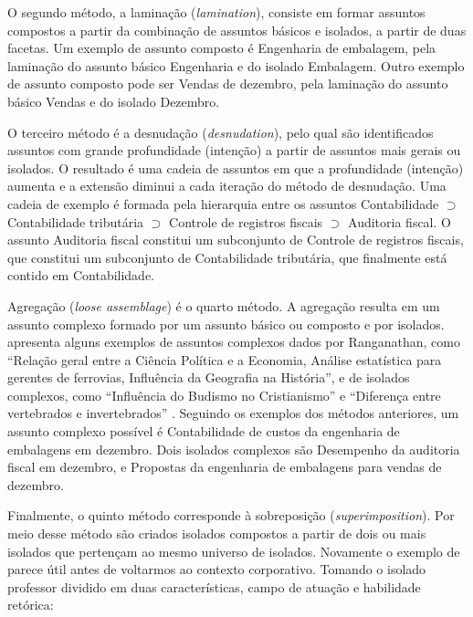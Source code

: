 
O segundo método, a laminação (\textit{lamination}), consiste em formar assuntos compostos a partir da combinação de assuntos básicos e isolados, a partir de duas facetas. Um exemplo de assunto composto é Engenharia de embalagem, pela laminação do assunto básico Engenharia e do isolado Embalagem. Outro exemplo de assunto composto pode ser Vendas de dezembro, pela laminação do assunto básico Vendas e do isolado Dezembro.

O terceiro método é a desnudação (\textit{desnudation}), pelo qual são identificados assuntos com grande profundidade (intenção) a partir de assuntos mais gerais ou isolados. O resultado é uma cadeia de assuntos em que a profundidade (intenção) aumenta e a extensão diminui a cada iteração do método de desnudação. Uma cadeia de exemplo é formada pela hierarquia entre os assuntos Contabilidade $\supset$ Contabilidade tributária $\supset$ Controle de registros fiscais $\supset$ Auditoria fiscal. O assunto Auditoria fiscal constitui um subconjunto de Controle de registros fiscais, que constitui um subconjunto de Contabilidade tributária, que finalmente está contido em Contabilidade.

Agregação (\textit{loose assemblage}) é o quarto método. A agregação resulta em um assunto complexo formado por um assunto básico ou composto e por isolados.  apresenta alguns exemplos de assuntos complexos dados por Ranganathan, como ``Relação geral entre a Ciência Política e a Economia, Análise estatística para gerentes de ferrovias, Influência da Geografia na História'', e de isolados complexos, como ``Influência do Budismo no Cristianismo'' e ``Diferença entre vertebrados e invertebrados'' \cite[p. 63]{lima04spiteri}. Seguindo os exemplos dos métodos anteriores, um assunto complexo possível é Contabilidade de custos da engenharia de embalagens em dezembro. Dois isolados complexos são Desempenho da auditoria fiscal em dezembro, e Propostas da engenharia de embalagens para vendas de dezembro.

Finalmente, o quinto método corresponde à sobreposição (\textit{superimposition}). Por meio desse método são criados isolados compostos a partir de dois ou mais isolados que pertençam ao mesmo universo de isolados. Novamente o exemplo de  parece útil antes de voltarmos ao contexto corporativo. Tomando o isolado professor dividido em duas características, campo de atuação e habilidade retórica:

